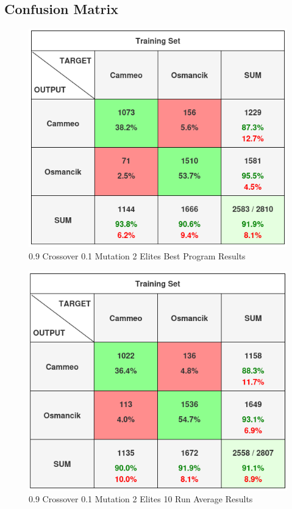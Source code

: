 \documentclass[]{report}
\begin{document}
\subsection{Confusion Matrix}

\begin{figure}[H]
	\centering
	\includegraphics[width=1.0\linewidth]{fp10}
	\caption{0.9 Crossover 0.1 Mutation 2 Elites Best Program Results}
	\label{fig:fp10}
\end{figure}

\begin{figure}[H]
	\centering
	\includegraphics[width=1.0\linewidth]{fp11}
	\caption{0.9 Crossover 0.1 Mutation 2 Elites 10 Run Average Results}
	\label{fig:fp11}
\end{figure}
\end{document}
